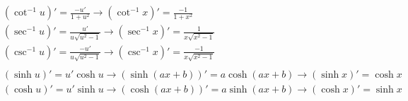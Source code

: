 \begin{multicols}{2}
\begin{align*}
&(\cot^{-1} u)' = \frac{-u'}{1+u^2} \longrightarrow (\cot^{-1}x)' = \frac{-1}{1+x^2} \\
&(\sec^{-1}u)' = \frac{u'}{u\sqrt{u^2-1}} \longrightarrow (\sec^{-1}x)' = \frac{1}{x\sqrt{x^2-1}} \\
&(\csc^{-1}u)' = \frac{-u'}{u\sqrt{u^2-1}} \longrightarrow (\csc^{-1}x)' = \frac{-1}{x\sqrt{x^2-1}} \\
\\
&(\sinh u)' = u'\cosh u \longrightarrow (\sinh(ax+b))' = a\cosh(ax+b) \longrightarrow (\sinh x)' = \cosh x \\
&(\cosh u)' = u'\sinh u \longrightarrow (\cosh(ax+b))' = a\sinh(ax+b) \longrightarrow (\cosh x)' = \sinh x  \\
\end{align*}

\end{multicols}